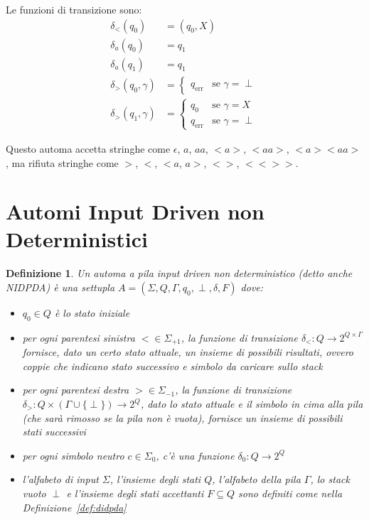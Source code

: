 \documentclass[a4paper,12pt]{report}
\newtheorem{definition}{Definizione}[chapter]
\theoremstyle{propositionstyle}
\begin{document}
    Le funzioni di transizione sono:
    \begin{align}
        \delta_{<}(q_0) &= (q_0, X) \\
        \delta_{a}(q_0) &= q_1 \\
        \delta_{a}(q_1) &= q_1 \\
        \delta_{>}(q_0, \gamma) &= \begin{cases}
            q_{\text{err}} & \text{se } \gamma = \perp
        \end{cases} \\
        \delta_{>}(q_1, \gamma) &= \begin{cases}
            q_0 & \text{se } \gamma = X \\
            q_{\text{err}} & \text{se } \gamma = \perp
        \end{cases}
    \end{align}
    
    Questo automa accetta stringhe come $\epsilon$, $a$, $aa$, $<a>$, $<aa>$, $<a><aa>$, ma rifiuta stringhe come $>$, $<$, $<a$, $a>$, $<>$, $<<>>$.

    \section{Automi Input Driven non Deterministici}

    \begin{definition}
        Un \textit{automa a pila input driven non deterministico} (detto anche NIDPDA) è una settupla $A = \left(\Sigma, Q, \Gamma, q_0, \perp, \delta, F\right)$ dove:
        \begin{itemize}
            \item $q_{0} \in Q$ è lo stato iniziale
            \item per ogni parentesi sinistra $< \in \Sigma_{+1}$, la funzione di transizione $\delta_{<} : Q \rightarrow 2^{Q \times \Gamma}$ fornisce, dato un certo stato attuale, un insieme di possibili risultati, ovvero coppie che indicano stato successivo e simbolo da caricare sullo stack
            \item per ogni parentesi destra $> \in \Sigma_{-1}$, la funzione di transizione $\delta_{>} : Q \times \left(\Gamma \cup \{\perp\}\right) \rightarrow 2^Q$, dato lo stato attuale e il simbolo in cima alla pila (che sarà rimosso se la pila non è vuota), fornisce un insieme di possibili stati successivi %
            \item per ogni simbolo neutro $c \in \Sigma_{0}$, c'è una funzione $\delta_{0} : Q \rightarrow 2^Q$
            \item l'alfabeto di input $\Sigma$, l'insieme degli stati $Q$, l'alfabeto della pila $\Gamma$, lo stack vuoto $\perp$ e l'insieme degli stati accettanti $F \subseteq Q$ sono definiti come nella Definizione~\ref{def:didpda}
        \end{itemize}
    \end{definition}
\end{document}
